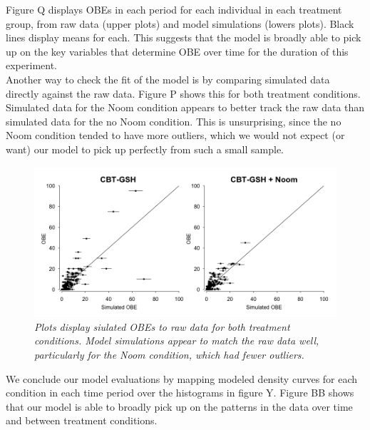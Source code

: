 \documentclass[12pt, oneside]{article}
\begin{document}
Figure Q displays OBEs in each period for each individual in each treatment group, from raw data (upper plots) and model simulations (lowers plots).  Black lines display means for each.  This suggests that the model is broadly able to pick up on the key variables that determine OBE over time for the duration of this experiment.
\\

Another way to check the fit of the model is by comparing simulated data directly against the raw data.  Figure P shows this for both treatment conditions.  Simulated data for the Noom condition appears to better track the raw data than simulated data for the no Noom condition.  This is unsurprising, since the no Noom condition tended to have more outliers, which we would not expect (or want) our model to pick up perfectly from such a small sample.  
\\

\begin{figure}
\centering
\includegraphics[width=\textwidth, height=\textheight, keepaspectratio]{obe_ppcs.png}
\caption{\emph{Plots display siulated OBEs to raw data for both treatment conditions.  Model simulations appear to match the raw data well, particularly for the Noom condition, which had fewer outliers.}}
\end{figure}

We conclude our model evaluations by mapping modeled density curves for each condition in each time period over the histograms in figure Y.  Figure BB shows that our model is able to broadly pick up on the patterns in the data over time and between treatment conditions.
\end{document}
